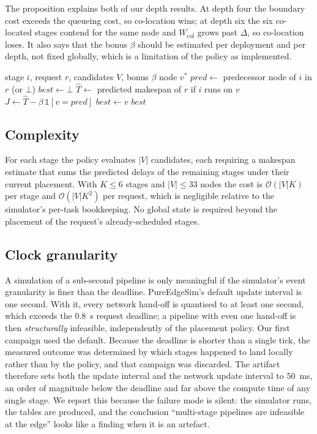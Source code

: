 \documentclass[journal,10pt]{IEEEtran}
\newcommand{\bigO}{\ensuremath{\mathcal{O}}}
\begin{document}
The proposition explains both of our depth results. At depth four the boundary
cost exceeds the queueing cost, so co-location wins; at depth six the six
co-located stages contend for the same node and $W_{\text{col}}$ grows past
$\Delta$, so co-location loses. It also says that the bonus $\beta$ should be
estimated per deployment and per depth, not fixed globally, which is a
limitation of the policy as implemented.

\begin{algorithm}[t]
\caption{Cross-layer placement for one stage of an ISCC request}
\label{alg:iscc}
\begin{algorithmic}[1]
\Require stage $i$, request $r$, candidates $V$, bonus $\beta$
\Ensure node $v^\ast$
\State $pred\gets$ predecessor node of $i$ in $r$ (or $\bot$)
\State $best\gets\bot$
  \State $\hat T\gets$ predicted makespan of $r$ if $i$ runs on $v$
  \State $J\gets\hat T-\beta\,\mathbb{1}[v=pred]$
   $best\gets v$ \EndIf
\EndFor
\State \Return $best$
\end{algorithmic}
\end{algorithm}

\subsection{Complexity}
For each stage the policy evaluates $|V|$ candidates, each requiring a
makespan estimate that sums the predicted delays of the remaining stages under
their current placement. With $K\le6$ stages and $|V|\le33$ nodes the cost is
$\bigO(|V|K)$ per stage and $\bigO(|V|K^2)$ per request, which is negligible
relative to the simulator's per-task bookkeeping. No global state is required
beyond the placement of the request's already-scheduled stages.

\subsection{Clock granularity}
\label{sec:clock}
A simulation of a sub-second pipeline is only meaningful if the simulator's
event granularity is finer than the deadline. PureEdgeSim's default update
interval is one second. With it, every network hand-off is quantised to at least
one second, which exceeds the $0.8$~s request deadline; a pipeline with even one
hand-off is then \emph{structurally} infeasible, independently of the placement
policy. Our first campaign used the default. Because the deadline is shorter than a
single tick, the measured outcome was determined by which stages happened to
land locally rather than by the policy, and that campaign was discarded. The artifact therefore sets both the update interval
and the network update interval to $50$~ms, an order of magnitude below the
deadline and far above the compute time of any single stage. We report this
because the failure mode is silent: the simulator runs, the tables are produced,
and the conclusion ``multi-stage pipelines are infeasible at the edge'' looks
like a finding when it is an artefact.
\end{document}
